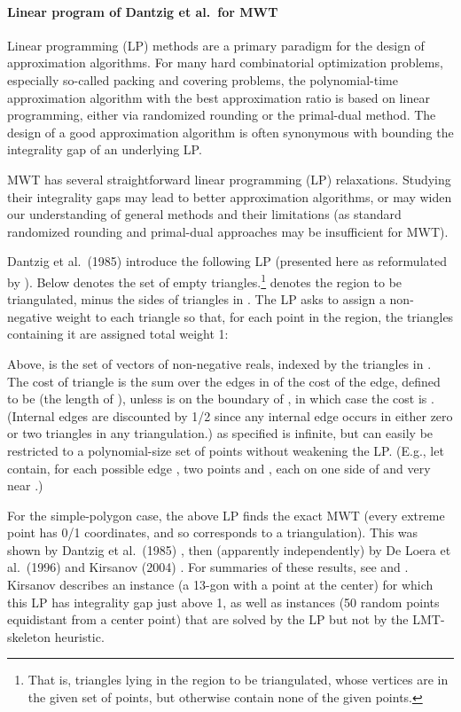 \documentclass[final]{siamltex}
\begin{document}
\paragraph{Linear program of Dantzig et al.~for MWT}
Linear programming (LP) methods are a primary paradigm
for the design of approximation algorithms.
For many hard combinatorial optimization problems, 
especially so-called packing and covering problems,
the polynomial-time approximation algorithm with the best approximation ratio
is based on linear programming,
either via randomized rounding or the primal-dual method.
The design of a good approximation algorithm 
is often synonymous with bounding the integrality gap
of an underlying LP.

MWT has several straightforward linear programming (LP) relaxations.
Studying their integrality gaps
may lead to better approximation algorithms,
or may widen our understanding 
of general methods and their limitations
(as standard randomized rounding and primal-dual approaches 
may be insufficient for MWT).

Dantzig et al.~(1985) introduce the following LP
(presented here as reformulated by \cite{de1996polytope}).
Below  denotes the set of empty triangles.\footnote
{That is, triangles lying in the region to be triangulated, 
whose vertices are in the given set of points,
but otherwise contain none of the given points.}
 denotes the region to be triangulated,
minus the sides of triangles in .
The LP asks to assign a non-negative weight  to
each triangle  so that, for each point  in the 
region, the triangles containing it are assigned total weight 1:

Above,  is the set of vectors of non-negative reals, 
indexed by the triangles in .
The cost  of triangle 
is the sum over the edges  in  of the cost  of the edge,
defined to be  (the length of ), unless  is on the boundary of ,
in which case the cost is .
(Internal edges are discounted by 1/2 since any internal edge occurs in either zero or two triangles in any triangulation.)
 as specified is infinite, 
but can easily be restricted to a polynomial-size set of points
without weakening the LP.  (E.g., let  contain, 
for each possible edge , two points  and , each on one side of  and very near .)

For the simple-polygon case, the above LP finds the exact MWT (every extreme point
has 0/1 coordinates, and so corresponds to a triangulation).
This was shown by Dantzig et al.~(1985)  \cite[Thm.~7]{dantzig1985triangulations},
then (apparently independently) by De Loera et al.~(1996) \cite[Thm.~4.1(i)]{de1996polytope}
and Kirsanov (2004) \cite[Cor.~3.6.2]{kirsanov2004minimal}.
For summaries of these results, see \cite[Ch.~8]{de2010triangulations} and \cite{takeuchi1998polytopes}.
Kirsanov describes an instance (a 13-gon with a point at the center) 
for which this LP has integrality gap just above 1,
as well as instances (50 random points equidistant from a center point)
that are solved by the LP but not by the LMT-skeleton heuristic.
\end{document}
